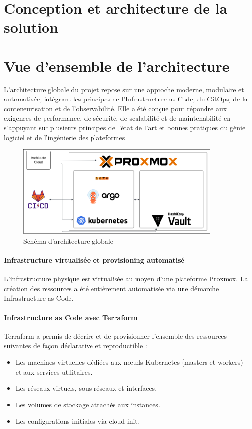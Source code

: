 \section{Conception et architecture de la solution}

\section{Vue d’ensemble de l’architecture}

L'architecture globale du projet repose sur une approche moderne, modulaire et automatisée, intégrant les principes de l'Infrastructure as Code, du GitOps, de la conteneurisation et de l'observabilité. Elle a été conçue pour répondre aux exigences de performance, de sécurité, de scalabilité et de maintenabilité en s'appuyant sur plusieurs principes de l’état de l’art et bonnes pratiques du génie logiciel et de l’ingénierie des plateformes

\begin{figure}[H]
	\centering
	\includegraphics[width=0.9\textwidth]{figures/architecture-globale.png}
	\caption{Schéma d'architecture globale}
\end{figure}

\paragraph{\textbf{Infrastructure virtualisée et provisioning automatisé}}

L'infrastructure physique est virtualisée au moyen d'une plateforme Proxmox. La création des ressources a été entièrement automatisée via une démarche Infrastructure as Code.

\paragraph{\textbf{Infrastructure as Code avec Terraform}}

Terraform a permis de décrire et de provisionner l'ensemble des ressources suivantes de façon déclarative et reproductible :
\begin{itemize}
	\item Les machines virtuelles dédiées aux nœuds Kubernetes (masters et workers) et aux services utilitaires.
	\item Les réseaux virtuels, sous-réseaux et interfaces.
	\item Les volumes de stockage attachés aux instances.
	\item Les configurations initiales via cloud-init.
\end{itemize}

